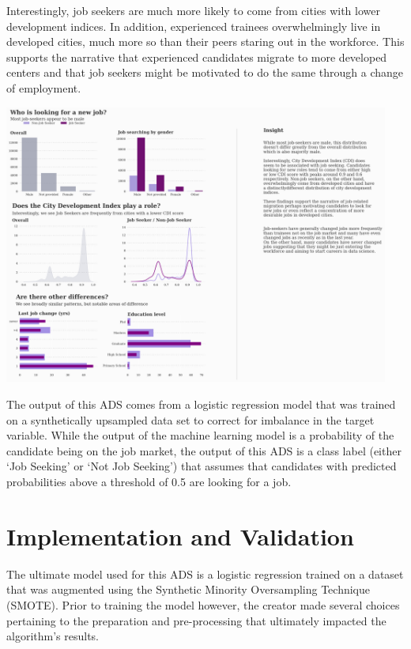 Interestingly, job seekers are much more likely to come from cities with lower development indices.  In addition, experienced trainees overwhelmingly live in developed cities, much more so than their peers staring out in the workforce.  This supports the narrative that experienced candidates migrate to more developed centers and that job seekers might be motivated to do the same through a change of employment.


\begin{center}
\includegraphics[width=0.95\textwidth]{download-1}
\end{center}
 

The output of this ADS comes from a logistic regression model that was trained on a synthetically upsampled data set to correct for imbalance in the target variable.  While the output of the machine learning model is a probability of the candidate being on the job market, the output of this ADS is a class label (either `Job Seeking' or `Not Job Seeking') that assumes that candidates with predicted probabilities above a threshold of 0.5 are looking for a job.




\pagebreak

\section{Implementation and Validation}

The ultimate model used for this ADS is a logistic regression trained on a dataset that was augmented using the Synthetic Minority Oversampling Technique (SMOTE).  Prior to training the model however, the creator made several choices pertaining to the preparation and pre-processing that ultimately impacted the algorithm's results.

